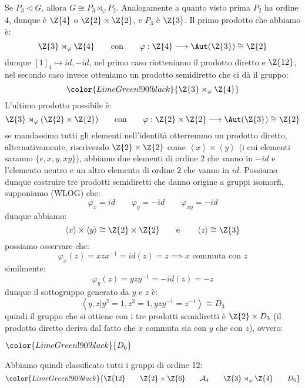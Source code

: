 \documentclass[11pt]{scrartcl}
\begin{document}
\begin{example}
    Se $P_3 \triangleleft G$, allora $G \cong P_3 \rtimes_{\varphi} P_2$. Analogamente a quanto visto prima $P_2$ ha ordine $4$, dunque è $\Z{4}$ o $\Z{2} \times \Z{2}$, e $P_3$ è $\Z{3}$.
    Il primo prodotto che abbiamo è:
        \[ \Z{3} \rtimes_{\varphi} \Z{4} \qquad \text{con} \qquad \varphi : \Z{4} \longrightarrow \Aut(\Z{3}) \cong \Z{2}
            \]
    dunque $[1]_4 \longmapsto id,-id$, nel primo caso riotteniamo il prodotto diretto e $\Z{12}$, nel secondo caso invece otteniamo un prodotto semidiretto che ci dà il gruppo:
        \[ \color{LimeGreen!90!black}{\Z{3} \rtimes_{\varphi} \Z{4}}
            \]
    L'ultimo prodotto possibile è:
        \[ \Z{3} \rtimes_{\varphi} (\Z{2} \times \Z{2}) \qquad \text{con} \qquad \varphi : \Z{2} \times \Z{2} \longrightarrow \Aut(\Z{3}) \cong \Z{2}
            \]
    se mandassimo tutti gli elementi nell'identità otterremmo un prodotto diretto, alternativamente, riscrivendo $\Z{2} \times \Z{2}$ come $\left<x\right> \times \left<y\right>$ (i cui elementi saranno $\{e,x,y,xy\}$), 
    abbiamo due elementi di ordine $2$ che vanno in $-id$ e l'elemento neutro e un altro elemento di ordine $2$ che vanno in $id$. Possiamo dunque costruire tre prodotti semidiretti che danno 
    origine a gruppi isomorfi, supponiamo (WLOG) che:
        \[ \varphi_x = id \qquad \varphi_y = -id \qquad \varphi_{xy} = -id
            \]
    dunque abbiamo:
        \[ \left<x\right> \times \left<y\right> \cong \Z{2} \times \Z{2} \qquad \text e \qquad \left<z\right> \cong \Z{3}
            \]
    possiamo osservare che:
        \[ \varphi_{x}(z) = xzx^{-1} = id(z) = z \implies \text{$x$ commuta con $z$}
            \]
    similmente:
        \[ \varphi_{y}(z) = yzy^{-1} = -id(z) = -z
            \]
    dunque il sottogruppo generato da $y$ e $z$ è:
        \[ \left<y,z | y^2 = 1, z^3 = 1, yzy^{-1} = z^{-1}\right> \cong D_3
            \]
    quindi il gruppo che si ottiene con i tre prodotti semidiretti è $\Z{2} \times D_3$ (il prodotto diretto deriva
    dal fatto che $x$ commuta sia con $y$ che con $z$), ovvero:
        \begin{center}
            $\color{LimeGreen!90!black}{D_6}$
        \end{center}
\end{example}

Abbiamo quindi classificato tutti i gruppi di ordine 12:
    \[ \color{LimeGreen!90!black}{\Z{12} \qquad \Z{2} \times \Z{6} \qquad \mathcal{A}_4 \qquad \Z{3} \rtimes_{\varphi} \Z{4} \qquad D_6}
        \]
\end{document}

